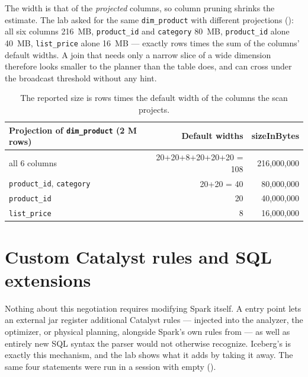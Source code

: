 The width is that of the \emph{projected} columns, so column pruning shrinks the
estimate. The lab asked for the same \texttt{dim\_product} with different
projections (): all six columns 216~MB, \texttt{product\_id}
and \texttt{category} 80~MB, \texttt{product\_id} alone 40~MB, \texttt{list\_price}
alone 16~MB --- exactly rows times the sum of the columns' default widths. A
join that needs only a narrow slice of a wide dimension therefore looks smaller to
the planner than the table does, and can cross under the broadcast threshold
without any hint.

\begin{table}[htbp]
\centering\footnotesize
\renewcommand{\arraystretch}{1.2}
\begin{tabular}{@{}P{6.0cm}rr@{}}
\toprule
\textbf{Projection of \texttt{dim\_product} (2 M rows)} & \textbf{Default widths} & \textbf{sizeInBytes} \\
\midrule
all 6 columns & 20+20+8+20+20+20 = 108 & 216,000,000 \\
\texttt{product\_id}, \texttt{category} & 20+20 = 40 & 80,000,000 \\
\texttt{product\_id} & 20 & 40,000,000 \\
\texttt{list\_price} & 8 & 16,000,000 \\
\bottomrule
\end{tabular}
\caption{The reported size is rows times the default width of the columns the scan
projects.}
\label{tab:dsv2-projection}
\end{table}

\section{Custom Catalyst rules and SQL extensions}
\label{sec:dsv2-extensions}

Nothing about this negotiation requires modifying Spark itself. A
 entry point lets an external jar register
additional Catalyst rules --- injected into the analyzer, the optimizer, or physical
planning, alongside Spark's own rules from  --- as well as
entirely new SQL syntax the parser would not otherwise recognize. Iceberg's
 is exactly this mechanism, and the lab shows
what it adds by taking it away. The same four statements were run in a session with
 empty ().

